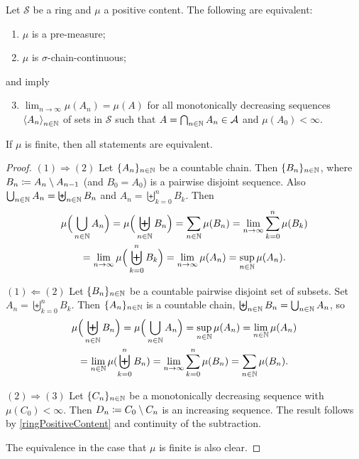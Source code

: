 \begin{proposition} \label{premeasureChainContinuous}
Let $\mathcal{S}$ be a ring and $\mu$ a positive content. The following are equivalent:
\begin{enumerate}
\item $\mu$ is a pre-measure;
\item $\mu$ is $\sigma$-chain-continuous;
\end{enumerate}
and imply
\begin{enumerate} \setcounter{enumi}{2}
\item $\lim_{n\to\infty}\mu(A_n) = \mu(A)$ for all monotonically decreasing sequences $\left\langle A_n \right\rangle_{n\in\mathbb{N}}$ of sets in $\mathcal{S}$ such that $A = \bigcap_{n\in\mathbb{N}} A_n \in\mathcal{A}$ and $\mu(A_0) < \infty$.
\end{enumerate}
If $\mu$ is finite, then all statements are equivalent.
\end{proposition}
\begin{proof}
$(1) \Rightarrow (2)$ Let $\{A_n\}_{n\in\mathbb{N}}$ be a countable chain. Then $\{B_n\}_{n\in \mathbb{N}}$, where $B_n \coloneqq A_{n}\setminus A_{n-1}$ (and $B_0 = A_0$) is a pairwise disjoint sequence. Also $\bigcup_{n\in \mathbb{N}}A_n = \biguplus_{n\in \mathbb{N}} B_n$ and $A_n = \biguplus_{k=0}^n B_k$. Then
\begin{multline*}
\mu\Big(\bigcup_{n\in \mathbb{N}}A_n\Big) = \mu\Big(\biguplus_{n\in \mathbb{N}} B_n\Big) = \sum_{n\in\mathbb{N}}\mu(B_n) = \lim_{n\to\infty}\sum_{k=0}^n\mu(B_k) \\ = \lim_{n\to\infty}\mu\Big(\biguplus_{k=0}^n B_k\Big) = \lim_{n\to\infty}\mu(A_n) = \sup_{n\in\mathbb{N}}\mu(A_n).
\end{multline*}

$(1) \Leftarrow (2)$ Let $\{B_n\}_{n\in\mathbb{N}}$ be a countable pairwise disjoint set of subsets. Set $A_n = \biguplus_{k=0}^nB_k$. Then $\{A_n\}_{n\in\mathbb{N}}$ is a countable chain, $\biguplus_{n\in \mathbb{N}} B_n = \bigcup_{n\in \mathbb{N}}A_n$, so
\begin{multline*}
\mu\Big(\biguplus_{n\in\mathbb{N}}B_n\Big) = \mu\Big(\bigcup_{n\in\mathbb{N}}A_n\Big) = \sup_{n\in\mathbb{N}}\mu(A_n) = \lim_{n\in\mathbb{N}}\mu(A_n) \\ = \lim_{n\in\mathbb{N}}\mu(\biguplus_{k=0}^nB_n) = \lim_{n\to\infty}\sum_{k=0}^n\mu(B_n) = \sum_{n\in\mathbb{N}}\mu(B_n).
\end{multline*}

$(2) \Rightarrow (3)$ Let $\{C_n\}_{n\in\mathbb{N}}$ be a monotonically decreasing sequence with $\mu(C_0) < \infty$. Then $D_n \coloneqq C_0\setminus C_n$ is an increasing sequence. The result follows by \ref{ringPositiveContent} and continuity of the subtraction.

The equivalence in the case that $\mu$ is finite is also clear.
\end{proof}

